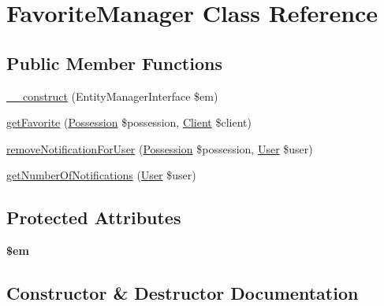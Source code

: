 \hypertarget{class_app_1_1_b_l_1_1_favorite_manager}{}\section{Favorite\+Manager Class Reference}
\label{class_app_1_1_b_l_1_1_favorite_manager}
\subsection*{Public Member Functions}
\begin{DoxyCompactItemize}
\item 
\mbox{\hyperlink{class_app_1_1_b_l_1_1_favorite_manager_a25f4258aeb5ce2a61a2504cb7c058485}{\+\_\+\+\_\+construct}} (Entity\+Manager\+Interface \$em)
\item 
\mbox{\hyperlink{class_app_1_1_b_l_1_1_favorite_manager_a106ef309e0dd2211ceaf91eaa96458a1}{get\+Favorite}} (\mbox{\hyperlink{class_app_1_1_entity_1_1_possession}{Possession}} \$possession, \mbox{\hyperlink{class_app_1_1_entity_1_1_client}{Client}} \$client)
\item 
\mbox{\hyperlink{class_app_1_1_b_l_1_1_favorite_manager_ae45b88a1a04372a68eded57eb69d782a}{remove\+Notification\+For\+User}} (\mbox{\hyperlink{class_app_1_1_entity_1_1_possession}{Possession}} \$possession, \mbox{\hyperlink{class_app_1_1_entity_1_1_user}{User}} \$user)
\item 
\mbox{\hyperlink{class_app_1_1_b_l_1_1_favorite_manager_a200457b8e54c874dda758a5a9c44f3be}{get\+Number\+Of\+Notifications}} (\mbox{\hyperlink{class_app_1_1_entity_1_1_user}{User}} \$user)
\end{DoxyCompactItemize}
\subsection*{Protected Attributes}
\begin{DoxyCompactItemize}
\item 
\mbox{\label{class_app_1_1_b_l_1_1_favorite_manager_a0f2991d5fed029ef50ef619f1a532d06}} 
{\bfseries \$em}
\end{DoxyCompactItemize}


\subsection{Constructor \& Destructor Documentation}
\mbox{\label{class_app_1_1_b_l_1_1_favorite_manager_a25f4258aeb5ce2a61a2504cb7c058485}} 
